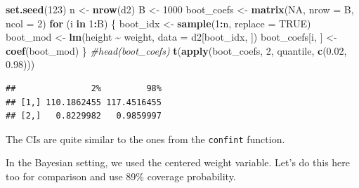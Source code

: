 \documentclass[
]{book}
\newenvironment{Shaded}{\begin{snugshade}}{\end{snugshade}}
\newcommand{\AttributeTok}[1]{\textcolor[rgb]{0.13,0.29,0.53}{#1}}
\newcommand{\CommentTok}[1]{\textcolor[rgb]{0.56,0.35,0.01}{\textit{#1}}}
\newcommand{\ConstantTok}[1]{\textcolor[rgb]{0.56,0.35,0.01}{#1}}
\newcommand{\ControlFlowTok}[1]{\textcolor[rgb]{0.13,0.29,0.53}{\textbf{#1}}}
\newcommand{\DecValTok}[1]{\textcolor[rgb]{0.00,0.00,0.81}{#1}}
\newcommand{\FloatTok}[1]{\textcolor[rgb]{0.00,0.00,0.81}{#1}}
\newcommand{\FunctionTok}[1]{\textcolor[rgb]{0.13,0.29,0.53}{\textbf{#1}}}
\newcommand{\NormalTok}[1]{#1}
\newcommand{\OtherTok}[1]{\textcolor[rgb]{0.56,0.35,0.01}{#1}}
\newcommand{\SpecialCharTok}[1]{\textcolor[rgb]{0.81,0.36,0.00}{\textbf{#1}}}
\begin{document}
\begin{Shaded}
\begin{Highlighting}[]
\FunctionTok{set.seed}\NormalTok{(}\DecValTok{123}\NormalTok{)}
\NormalTok{n }\OtherTok{\textless{}{-}} \FunctionTok{nrow}\NormalTok{(d2)}
\NormalTok{B }\OtherTok{\textless{}{-}} \DecValTok{1000}
\NormalTok{boot\_coefs }\OtherTok{\textless{}{-}} \FunctionTok{matrix}\NormalTok{(}\ConstantTok{NA}\NormalTok{, }\AttributeTok{nrow =}\NormalTok{ B, }\AttributeTok{ncol =} \DecValTok{2}\NormalTok{)}
\ControlFlowTok{for}\NormalTok{ (i }\ControlFlowTok{in} \DecValTok{1}\SpecialCharTok{:}\NormalTok{B) \{}
\NormalTok{  boot\_idx }\OtherTok{\textless{}{-}} \FunctionTok{sample}\NormalTok{(}\DecValTok{1}\SpecialCharTok{:}\NormalTok{n, }\AttributeTok{replace =} \ConstantTok{TRUE}\NormalTok{)}
\NormalTok{  boot\_mod }\OtherTok{\textless{}{-}} \FunctionTok{lm}\NormalTok{(height }\SpecialCharTok{\textasciitilde{}}\NormalTok{ weight, }\AttributeTok{data =}\NormalTok{ d2[boot\_idx, ])}
\NormalTok{  boot\_coefs[i, ] }\OtherTok{\textless{}{-}} \FunctionTok{coef}\NormalTok{(boot\_mod)}
\NormalTok{\}}
\CommentTok{\#head(boot\_coefs)}
\FunctionTok{t}\NormalTok{(}\FunctionTok{apply}\NormalTok{(boot\_coefs, }\DecValTok{2}\NormalTok{, quantile, }\FunctionTok{c}\NormalTok{(}\FloatTok{0.02}\NormalTok{, }\FloatTok{0.98}\NormalTok{)))}
\end{Highlighting}
\end{Shaded}

\begin{verbatim}
##               2%         98%
## [1,] 110.1862455 117.4516455
## [2,]   0.8229982   0.9859997
\end{verbatim}

The CIs are quite similar to the ones from the \texttt{confint} function.

In the Bayesian setting, we used the centered weight variable. Let's do this here too for
comparison and use 89\% coverage probability.

\begin{Shaded}
\end{Shaded}
\end{document}
